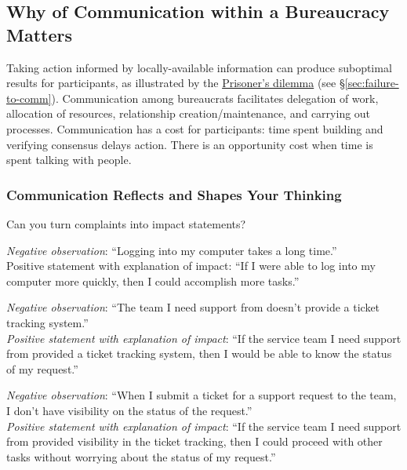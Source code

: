 \subsection{Why of Communication within a Bureaucracy Matters}

Taking action informed by locally-available information can produce suboptimal results for participants, as illustrated by the \href{https://en.wikipedia.org/wiki/Prisoner\%27s\_dilemma}{Prisoner's dilemma} (see \S\ref{sec:failure-to-comm}). Communication among bureaucrats facilitates delegation of work, allocation of resources, relationship creation/maintenance, and carrying out processes. Communication has a cost for participants: time spent building and verifying consensus delays action. There is an opportunity cost when time is spent talking with people.




\subsubsection{Communication Reflects and Shapes Your Thinking}

Can you turn complaints into impact statements? 

\textit{Negative observation}: ``Logging into my computer takes a long time.''\\
Positive statement with explanation of impact: ``If I were able to log into my computer more quickly, then I could accomplish more tasks.''

\textit{Negative observation}: ``The team I need support from doesn't provide a ticket tracking system.''\\
\textit{Positive statement with explanation of impact}: ``If the service team I need support from provided a ticket tracking system, then I would be able to know the status of my request.''

\textit{Negative observation}: ``When I submit a ticket for a support request to the team, I don't have visibility on the status of the request.''\\
\textit{Positive statement with explanation of impact}: ``If the service team I need support from provided visibility in the ticket tracking, then I could proceed with other tasks without worrying about the status of my request.''


